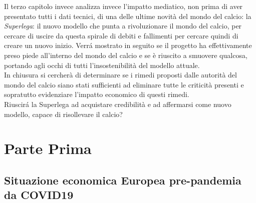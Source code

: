 \documentclass[
    corpo=12pt,
    oneside,
    evenboxes,
    tipotesi=triennale,
    stile=classica,
    oldstyle,
    autoretitolo,
    greek,
]{toptesi}
\begin{document}
\begin{interlinea}{1.5}
Il terzo capitolo invece analizza invece l'impatto mediatico, non prima di aver presentato tutti i dati tecnici, di una delle ultime novità 
del mondo del calcio: la \emph{Superlega}: il nuovo modello che punta a rivoluzionare il mondo del calcio, per cercare di uscire da questa spirale di debiti
e fallimenti per cercare quindi di creare un nuovo inizio. Verr\'a mostrato in seguito se il progetto ha effettivamente preso piede all'interno del mondo del calcio 
e se è riuscito a smuovere qualcosa, portando agli occhi di tutti l'insostenibilità del modello attuale.\\
In chiusura si cercherà di determinare se i rimedi proposti dalle autorità del mondo del calcio siano stati sufficienti ad eliminare tutte le criticità presenti e 
sopratutto evidenziare l'impatto economico di questi rimedi.\\
Riuscir\'a la Superlega ad acquistare credibilità e ad affermarsi come nuovo modello, capace di risollevare il calcio?

\part{Parte Prima}
\chapter{Situazione economica Europea pre-pandemia da COVID19}

\end{interlinea}
\end{document}
